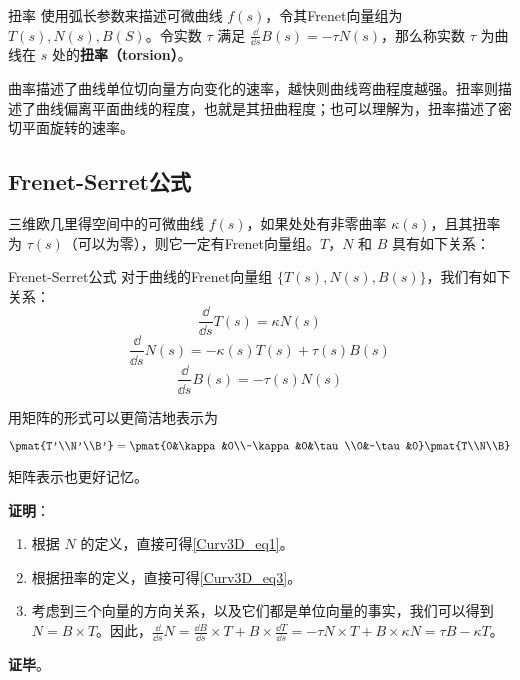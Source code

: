 \begin{definition}{扭率}
使用弧长参数来描述可微曲线 $f(s)$，令其Frenet向量组为 $T(s), N(s), B(S)$。令实数 $\tau$ 满足 $\frac{\dd}{\dd s}B(s)=-\tau N(s)$，那么称实数 $\tau$ 为曲线在 $s$ 处的\textbf{扭率（torsion）}。
\end{definition}

曲率描述了曲线单位切向量方向变化的速率，越快则曲线弯曲程度越强。扭率则描述了曲线偏离平面曲线的程度，也就是其扭曲程度；也可以理解为，扭率描述了密切平面旋转的速率。

\subsection{Frenet-Serret公式}

三维欧几里得空间中的可微曲线 $f(s)$，如果处处有非零曲率 $\kappa(s)$，且其扭率为 $\tau(s)$（可以为零），则它一定有Frenet向量组。$T$，$N$ 和 $B$ 具有如下关系：

\begin{theorem}{Frenet-Serret公式}
对于曲线的Frenet向量组 $\{T(s), N(s), B(s)\}$，我们有如下关系：
\begin{equation}\label{Curv3D_eq1}
\frac{\dd}{\dd s}T(s)=\kappa N(s)
\end{equation}
\begin{equation}\label{Curv3D_eq2}
\frac{\dd}{\dd s}N(s)=-\kappa(s) T(s)+\tau(s) B(s)
\end{equation}
\begin{equation}\label{Curv3D_eq3}
\frac{\dd}{\dd s}B(s)=-\tau(s) N(s)
\end{equation}

用矩阵的形式可以更简洁地表示为

\begin{equation}
\pmat{T'\\N'\\B'}=\pmat{0&\kappa&0\\-\kappa&0&\tau\\0&-\tau&0}\pmat{T\\N\\B}
\end{equation}

矩阵表示也更好记忆。
\end{theorem}

\textbf{证明}：

\begin{enumerate}
\item 根据 $N$ 的定义，直接可得\autoref{Curv3D_eq1}。
\item 根据扭率的定义，直接可得\autoref{Curv3D_eq3}。
\item 考虑到三个向量的方向关系，以及它们都是单位向量的事实，我们可以得到 $N=B\times T$。因此，$\frac{\dd}{\dd s}N=\frac{\dd B}{\dd s}\times T+B\times\frac{\dd T}{\dd s}=-\tau N\times T+B\times\kappa N=\tau B-\kappa T$。
\end{enumerate}

\textbf{证毕}。





